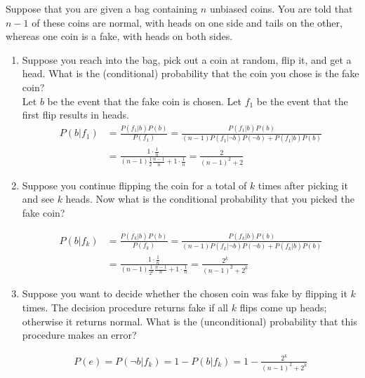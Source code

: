 \documentclass[12pt]{article}
\newenvironment{problem}[2][Problem]{\begin{trivlist}
\item[\hskip \labelsep {\bfseries #1}\hskip \labelsep {\bfseries #2.}]}{\end{trivlist}}
\begin{document}
\begin{problem}{2}
	Suppose that you are given a bag containing $n$ unbiased coins.
	You are told that $n-1$ of these coins are normal, with heads on one side and tails on the other,
	whereas one coin is a fake, with heads on both sides.
	 \begin{enumerate}
		 \item Suppose you reach into the bag, pick out a coin at random, flip it, and get a head.
			 What is the (conditional) probability that the coin you chose is the fake coin?\\

			 Let $b$ be the event that the fake coin is chosen.
			 Let $f_1$ be the event that the first flip results in heads.
			 \begin{align*}
				 P(b|f_1)
				 &=\frac{P(f_1|b)P(b)}{P(f_1)}
				 =\frac{P(f_1|b)P(b)}{(n-1)P(f_1|\neg b)P(\neg b)+P(f_1|b)P(b)} \\
				 &=\frac{1 \cdot \frac{1}{n}}{(n-1)\frac{1}{2}\frac{n-1}{n}+1 \cdot \frac{1}{n}}
				 =\frac{2}{(n-1)^2+2}
			 \end{align*}
		 \item Suppose you continue flipping the coin for a total of $k$ times after picking it and see $k$ heads.
			 Now what is the conditional probability that you picked the fake coin?

			 \begin{align*}
				 P(b|f_k)
				 &=\frac{P(f_k|b)P(b)}{P(f_k)}
				 =\frac{P(f_k|b)P(b)}{(n-1)P(f_k|\neg b)P(\neg b)+P(f_k|b)P(b)} \\
				 &=\frac{1 \cdot \frac{1}{n}}{(n-1)\frac{1}{2^k}\frac{n-1}{n}+1 \cdot \frac{1}{n}}
				 =\frac{2^k}{(n-1)^2+2^k}
			 \end{align*}
		 \item Suppose you want to decide whether the chosen coin was fake by flipping it $k$ times.
			 The decision procedure returns fake if all $k$ flips come up heads; otherwise it returns normal.
			 What is the (unconditional) probability that this procedure makes an error?

			 \begin{align*}
				 P(e)=P(\neg b|f_k)=1-P(b|f_k)=1-\frac{2^k}{(n-1)^2+2^k}
			 \end{align*}
	 \end{enumerate}
\end{problem}
\end{document}
